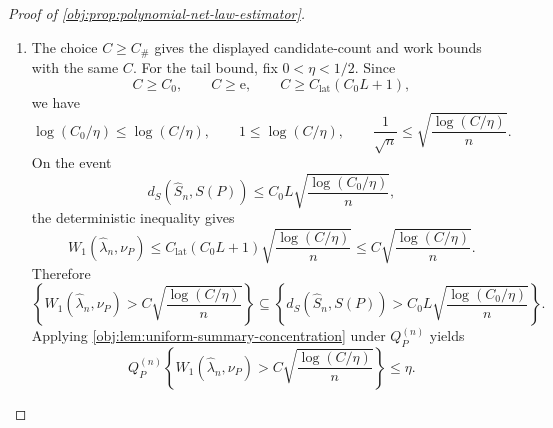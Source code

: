 \begin{proof}[Proof of \cref{obj:prop:polynomial-net-law-estimator}]
\begin{enumerate}
\item The choice \(C\ge C_\#\) gives the displayed candidate-count and work bounds with the same \(C\).  For the tail bound, fix \(0<\eta<1/2\).  Since
\[
C\ge C_0,\qquad C\ge\mathrm e,\qquad C\ge C_{\mathrm{lat}}(C_0L+1),
\]
we have
\[
\log(C_0/\eta)\le\log(C/\eta),
\qquad
1\le\log(C/\eta),
\qquad
\frac1{\sqrt n}\le\sqrt{\frac{\log(C/\eta)}{n}}.
\]
On the event
\[
d_S(\widehat S_n,S(P))
\le
C_0L\sqrt{\frac{\log(C_0/\eta)}{n}},
\]
the deterministic inequality gives
\[
W_1(\widehat\lambda_n,\nu_P)
\le
C_{\mathrm{lat}}(C_0L+1)
\sqrt{\frac{\log(C/\eta)}{n}}
\le
C\sqrt{\frac{\log(C/\eta)}{n}}.
\]
Therefore
\[
\left\{
W_1(\widehat\lambda_n,\nu_P)>
C\sqrt{\frac{\log(C/\eta)}{n}}
\right\}
\subseteq
\left\{
d_S(\widehat S_n,S(P))>
C_0L\sqrt{\frac{\log(C_0/\eta)}{n}}
\right\}.
\]
Applying \cref{obj:lem:uniform-summary-concentration} under \(Q_P^{(n)}\) yields
\[
Q_P^{(n)}
\left\{
W_1(\widehat\lambda_n,\nu_P)>
C\sqrt{\frac{\log(C/\eta)}{n}}
\right\}
\le\eta .
\] %
\end{enumerate}
\end{proof}


